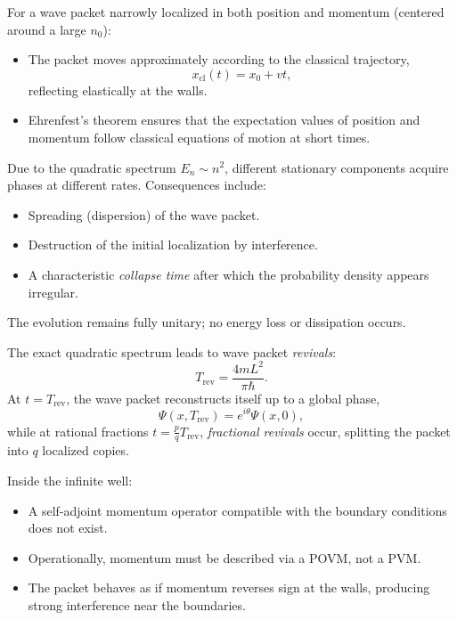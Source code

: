 For a wave packet narrowly localized in both position and momentum (centered around a large $n_0$):
\begin{itemize}
    \item The packet moves approximately according to the classical trajectory,
    \begin{equation}
    x_{\mathrm{cl}}(t) = x_0 + v t,
    \end{equation}
    reflecting elastically at the walls.
    \item Ehrenfest's theorem ensures that the expectation values of position and momentum follow classical equations of motion at short times.
\end{itemize}

Due to the quadratic spectrum $E_n \sim n^2$, different stationary components acquire phases at different rates.  
Consequences include:
\begin{itemize}
    \item Spreading (dispersion) of the wave packet.
    \item Destruction of the initial localization by interference.
    \item A characteristic \emph{collapse time} after which the probability density appears irregular.
\end{itemize}
The evolution remains fully unitary; no energy loss or dissipation occurs.

The exact quadratic spectrum leads to wave packet \emph{revivals}:
\begin{equation}
T_{\mathrm{rev}} = \frac{4 m L^2}{\pi \hbar}.
\end{equation}
At $t = T_{\mathrm{rev}}$, the wave packet reconstructs itself up to a global phase,
\begin{equation}
\Psi(x,T_{\mathrm{rev}}) = e^{i \theta} \Psi(x,0),
\end{equation}
while at rational fractions $t = \frac{p}{q} T_{\mathrm{rev}}$, \emph{fractional revivals} occur, splitting the packet into $q$ localized copies.

Inside the infinite well:
\begin{itemize}
    \item A self-adjoint momentum operator compatible with the boundary conditions does not exist.
    \item Operationally, momentum must be described via a POVM, not a PVM.
    \item The packet behaves as if momentum reverses sign at the walls, producing strong interference near the boundaries.
\end{itemize}

